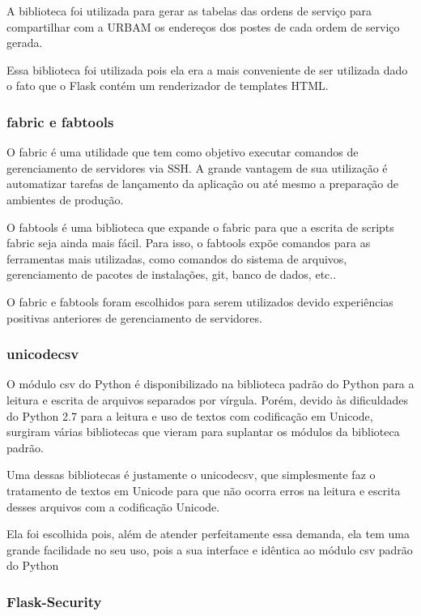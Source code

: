 \documentclass[
	article,			%
	11pt,				%
	oneside,			%
	a4paper,			%
	english,			%
	brazil,				%
	sumario=tradicional
	]{abntex2}
\begin{document}
A biblioteca foi utilizada para gerar as tabelas das ordens de serviço para compartilhar com a URBAM os endereços dos postes de cada ordem de serviço gerada.

Essa biblioteca foi utilizada pois ela era a mais conveniente de ser utilizada dado o fato que o Flask contém um renderizador de templates HTML.

\subsubsection{fabric e fabtools}

O fabric é uma utilidade que tem como objetivo executar comandos de gerenciamento de servidores via SSH.
A grande vantagem de sua utilização é automatizar tarefas de lançamento da aplicação ou até mesmo a preparação de ambientes de produção.\cite{fabric}

O fabtools é uma biblioteca que expande o fabric para que a escrita de scripts fabric seja ainda mais fácil.
Para isso, o fabtools expõe comandos para as ferramentas mais utilizadas, como comandos do sistema de arquivos, gerenciamento de pacotes de instalações, git, banco de dados, etc.. \cite{fabtools}

O fabric e fabtools foram escolhidos para serem utilizados devido experiências positivas anteriores de gerenciamento de servidores.

\subsubsection{unicodecsv}

O módulo csv do Python é disponibilizado na biblioteca padrão do Python para a leitura e escrita de arquivos separados por vírgula.
Porém, devido às dificuldades do Python 2.7 para a leitura e uso de textos com codificação em Unicode, surgiram várias bibliotecas que vieram para suplantar os módulos da biblioteca padrão.

Uma dessas bibliotecas é justamente o unicodecsv, que simplesmente faz o tratamento de textos em Unicode para que não ocorra erros na leitura e escrita desses arquivos com a codificação Unicode. \cite{unicodecsv}

Ela foi escolhida pois, além de atender perfeitamente essa demanda, ela tem uma grande facilidade no seu uso, pois a sua interface e idêntica ao módulo csv padrão do Python

\subsubsection{Flask-Security}
\end{document}
